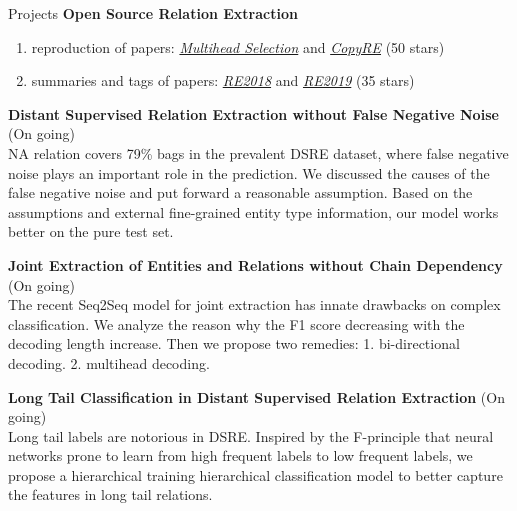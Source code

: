 \documentclass{resume} %
\begin{document}
\begin{rSection}{Projects}
{\bf Open Source Relation Extraction}
\begin{enumerate}
    \item reproduction of papers: \href{https://github.com/WindChimeRan/pytorch_multi_head_selection_re}{\textit{Multihead Selection}} and \href{https://github.com/WindChimeRan/pytorch_copy_re}{\textit{CopyRE}} (50 stars)
    \item summaries and tags of papers: \href{https://github.com/WindChimeRan/NREPapers2018}{\textit{RE2018}} and \href{https://github.com/WindChimeRan/NREPapers2019}{\textit{RE2019}} (35 stars)
\end{enumerate}

{\bf Distant Supervised Relation Extraction without False Negative Noise} (On going)\\
    NA relation covers 79\% bags in the prevalent DSRE dataset, where false negative noise plays an important role in the prediction. We discussed the causes of the false negative noise and put forward a reasonable assumption. Based on the assumptions and external fine-grained entity type information, our model works better on the pure test set.

{\bf Joint Extraction of Entities and Relations without Chain Dependency} (On going)\\
    The recent Seq2Seq model for joint extraction has innate drawbacks on complex classification. We analyze the reason why the F1 score decreasing with the decoding length increase. Then we propose two remedies: 1. bi-directional decoding. 2. multihead decoding.

    {\bf Long Tail Classification in Distant Supervised Relation Extraction} (On going)\\
    Long tail labels are notorious in DSRE. Inspired by the F-principle that neural networks prone to learn from high frequent labels to low frequent labels, we propose a hierarchical training hierarchical classification model to better capture the features in long tail relations.
    

\end{rSection}
\end{document}
